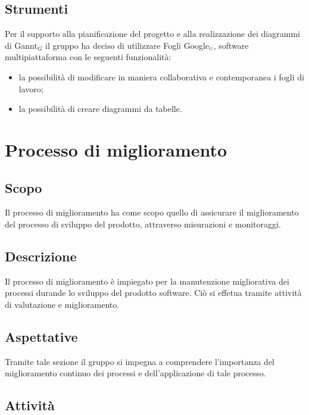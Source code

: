 \subsection{Strumenti}\label{ProcessiOrganizzativiProcessoDiPianificazioneStrumenti}
Per il supporto alla pianificazione del progetto e alla realizzazione dei diagrammi di Gannt$_G$ il gruppo ha deciso di utilizzare Fogli Google$_{\scaleto{G}{3pt}}$, software multipiattaforma con le seguenti funzionalità:
\begin{itemize}
	\item la possibilità di modificare in maniera collaborativa e contemporanea i fogli di lavoro;
	\item la possibilità di creare diagrammi da tabelle.
\end{itemize}

\section{Processo di miglioramento} \label{ProcessiOrganizzativiProcessoDiMiglioramento}
\subsection{Scopo} \label{ProcessiOrganizzativiProcessoDiMiglioramentoScopo}
Il processo di miglioramento ha come scopo quello di assicurare il miglioramento del processo di sviluppo del prodotto, attraverso misurazioni e monitoraggi. 
\subsection{Descrizione} \label{ProcessiOrganizzativiProcessoDiMiglioramentoDescizione}
Il processo di miglioramento è impiegato per la manutenzione migliorativa dei processi durande lo sviluppo del prodotto software. Ciò si effetua tramite attività di valutazione e miglioramento.  
\subsection{Aspettative} \label{ProcessiOrganizzativiProcessoDiMiglioramentoAspettative}
Tramite tale sezione il gruppo si impegna a comprendere l'importanza del miglioramento continuo dei processi e dell'applicazione di tale processo. 
\subsection{Attività} \label{ProcessiOrganizzativiProcessoDiMiglioramentoAttività}
